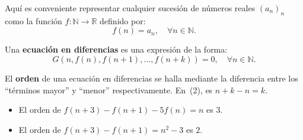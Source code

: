 \begin{frame}
	\frametitle{\subsecname}
	Aquí es conveniente representar cualquier sucesión de números reales $(a_{n})_{n} $ como la función $f\colon\mathds{N}\rightarrow\mathds{R}$ definido por: \[ f(n)=a_{n},\quad\forall n\in\mathds{N}. \]
	\begin{definition}
		Una \textbf{ecuación en diferencias} es una expresión de la forma:
		\begin{equation}\label{eq:diffeq}
		G\left(n,f(n),f\left(n+1\right),\ldots,f\left(n+k\right)\right)=0,\quad\forall n\in\mathds{N}.
		\end{equation}
	\end{definition}
	El \textbf{orden} de una ecuación en diferencias se halla mediante la diferencia entre los ``términos mayor'' y ``menor'' respectivamente. En~(2), es \alert{$n+k-n=k$}.%
	\begin{example}
		\begin{itemize}
			\item El \alert{orden} de $f\left(n+3\right)-f\left(n+1\right)-5f(n)=n$ es \alert{$3$}.
			\item El \alert{orden} de $f\left(n+3\right)-f\left(n+1\right)=n^{2}-3$ es \alert{$2$}.
		\end{itemize}
	\end{example}
\end{frame}


